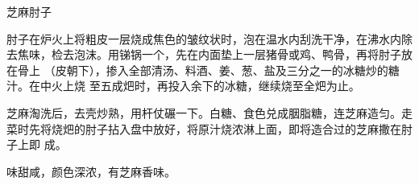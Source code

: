 \begin{recipe}{芝麻肘子}

\ingredients


\preparation

\step 肘子在炉火上将粗皮一层烧成焦色的皱纹状时，泡在温水内刮洗干净，在沸水内除
去焦味，检去泡沫。用锑锅一个，先在内面垫上一层猪骨或鸡、鸭骨，再将肘子放在骨上
（皮朝下），掺入全部清汤、料酒、姜、葱、盐及三分之一的冰糖炒的糖汁。在中火上烧
至五成𤆵时，再投入余下的冰糖，继续烧至全𤆵为止。

\step 芝麻淘洗后，去壳炒熟，用杆仗碾一下。白糖、食色兑成胭脂糖，连芝麻造匀。走
菜时先将烧𤆵的肘子拈入盘中放好，将原汁烧浓淋上面，即将造合过的芝麻撒在肘子上即
成。

\features

味甜咸，颜色深浓，有芝麻香味。

\end{recipe}

